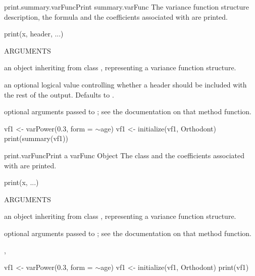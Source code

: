 \documentclass[pdftex]{article} \usepackage{url,graphicx}
\renewcommand{\Twiddle}{\mbox{\(\sim\)}}
\begin{document}
\begin{Helpfile}{print.summary.varFunc}{Print summary.varFunc}
The variance function structure description, the formula and the
coefficients  associated with  are printed.
\begin{Example}
print(x, header, ...)
\end{Example}
\begin{Argument}{ARGUMENTS}
\item[\Co{x:}]
an object inheriting from class , representing a
variance function structure.
\item[\Co{header:}]
an optional logical value controlling whether a header
should be included with the rest of the output. Defaults to
.
\item[\Co{...:}]
optional arguments passed to ; see
the documentation on that method function.
\end{Argument}
\need 15pt
\vspace{-16pt} 
\begin{Example}
vf1 <- varPower(0.3, form = \Twiddle age)
vf1 <- initialize(vf1, Orthodont)
print(summary(vf1))
\end{Example}
\end{Helpfile}
\begin{Helpfile}{print.varFunc}{Print a varFunc Object}
The class and the coefficients associated with  are printed.
\begin{Example}
print(x, ...)
\end{Example}
\begin{Argument}{ARGUMENTS}
\item[\Co{x:}]
an object inheriting from class , representing a
variance function structure.
\item[\Co{...:}]
optional arguments passed to ; see
the documentation on that method function.
\end{Argument}
,
\need 15pt
\vspace{-16pt} 
\begin{Example}
vf1 <- varPower(0.3, form = \Twiddle age)
vf1 <- initialize(vf1, Orthodont)
print(vf1)
\end{Example}
\end{Helpfile}
\end{document}
